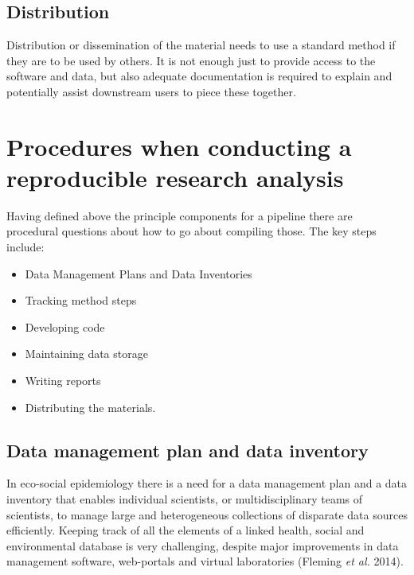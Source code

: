 \documentclass[11pt,a4paper]{article}
\begin{document}
\subsection{Distribution}\label{distribution}

Distribution or dissemination of the material needs to use a standard
method if they are to be used by others. It is not enough just to
provide access to the software and data, but also adequate documentation
is required to explain and potentially assist downstream users to piece
these together.

\section{Procedures when conducting a reproducible research
analysis}\label{procedures-when-conducting-a-reproducible-research-analysis}

Having defined above the principle components for a pipeline there are
procedural questions about how to go about compiling those. The key
steps include:

\begin{itemize}
\itemsep1pt\parskip0pt
\item
  Data Management Plans and Data Inventories
\item
  Tracking method steps
\item
  Developing code
\item
  Maintaining data storage
\item
  Writing reports
\item
  Distributing the materials.
\end{itemize}

\subsection{Data management plan and data
inventory}\label{data-management-plan-and-data-inventory}

In eco-social epidemiology there is a need for a data management plan
and a data inventory that enables individual scientists, or
multidisciplinary teams of scientists, to manage large and heterogeneous
collections of disparate data sources efficiently. Keeping track of all
the elements of a linked health, social and environmental database is
very challenging, despite major improvements in data management
software, web-portals and virtual laboratories (Fleming \emph{et al.}
2014).
\end{document}

